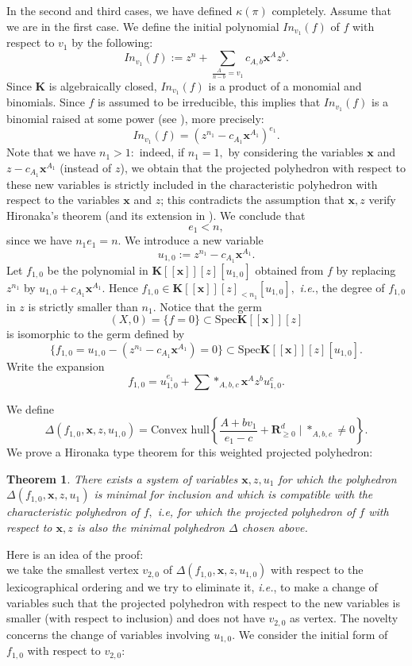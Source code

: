 \documentclass[11pt, a4paper]{amsart}
\numberwithin{equation}{section}
\theoremstyle{plain}
\newtheorem{Thm}{Theorem}[section]
\theoremstyle{definition}
\theoremstyle{remark}
\newcommand{\K}{\mathbf{K}}
\newcommand{\0}{{\boldsymbol 0}}
\newcommand{\x}{{\boldsymbol x}}
\begin{document}
     In the second and third cases, we have defined $\kappa(\pi)$ completely. Assume that we are in the first case.
    We define the initial polynomial $In_{v_1}(f)$ of $f$ with respect to $v_1$ by the following:
    \begin{equation}
    In_{v_1}(f):=z^n+\sum_{\frac{A}{n-b}=v_1} c_{A,b}\x^Az^b.
\end{equation}  
Since $\K$ is algebraically closed,  $In_{v_1}(f)$ is a product of a monomial and binomials. Since $f$ is assumed to be irreducible, this implies that  $In_{v_1}(f)$ is a binomial raised at some power (see \cite{BGP,RS}), more precisely:
\begin{equation}
    In_{v_1}(f)=(z^{n_1}-c_{A_1}\x^{A_1})^{e_1}.
\end{equation} 
   Note that we have $n_1>1:$ indeed, if $n_1=1,$  by considering the variables $\x$ and $z-c_{A_1}\x^{A_1}$ (instead of $z$), we obtain that the projected polyhedron with respect to these new variables is strictly included in  the characteristic polyhedron with respect to the variables $\x$ and $z$; this contradicts the assumption that $\x,z$ verify Hironaka's theorem (and its extension in \cite{MS}). We conclude that
\begin{equation}
e_1<n,
\end{equation}  
since we have $n_1e_1=n.$ We introduce a new variable 
$$u_{1,0}:=z^{n_1}-c_{A_1}\x^{A_1}.$$
Let $f_{1,0}$ be the polynomial in $\K[[\x]][z][u_{1,0}]$ obtained from $f$ by replacing $z^{n_1}$ by $u_{1,0}+c_{A_1}\x^{A_1}.$ Hence $f_{1,0} \in \K[[\x]][z]_{<n_1}[u_{1,0}],$ \textit{i.e.}, the degree of $f_{1,0}$ in $z$ is strictly smaller than $n_1.$ Notice that the germ 
$$(X,0)=\{f=0\}\subset \mathrm{Spec} \K[[\x]][z]$$
is isomorphic to the germ defined by  $$\{f_{1,0}=u_{1,0}-(z^{n_1}-c_{A_1}\x^{A_1})=0\}\subset  \mathrm{Spec} \K[[\x]][z][u_{1,0}].$$ 
Write the expansion
$$f_{1,0}=u_{1,0}^{e_1}+\sum *_{A,b,c}\x^Az^bu_{1,0}^c.$$ 

We define 
$$\Delta(f_{1,0},\x,z,u_{1,0})=\mbox{Convex hull}\left\{\frac{A+bv_1}{e_1-c}+\mathbf{R}_{\geq 0}^d\mid *_{A,b,c}\not=0 \right\}.$$
We prove a Hironaka type theorem for this weighted projected polyhedron: 
\begin{Thm}\cite{MS,MS1}
There exists a system of variables $\x,z,u_{1}$ for which the polyhedron $\Delta(f_{1,0},\x,z,u_1)$ is minimal for inclusion and which is compatible with the characteristic polyhedron of $f,$ \textit{i.e}, for which the projected polyhedron of $f$ with respect to $\x,z$ is also the minimal polyhedron $\Delta$ chosen above.   
\end{Thm} Here is an idea of the proof:\\ we take the smallest vertex $v_{2,0}$ of $\Delta(f_{1,0},\x,z,u_{1,0})$ with respect to the lexicographical ordering and we try to eliminate it, \textit{i.e.}, to make a change of variables such that the projected polyhedron with respect to the new variables is smaller (with respect to inclusion) and does not have $v_{2,0}$ as vertex. The novelty concerns the change of variables involving $u_{1,0}.$ We consider the initial form of $f_{1,0}$  with respect to $v_{2,0}:$
\end{document}
